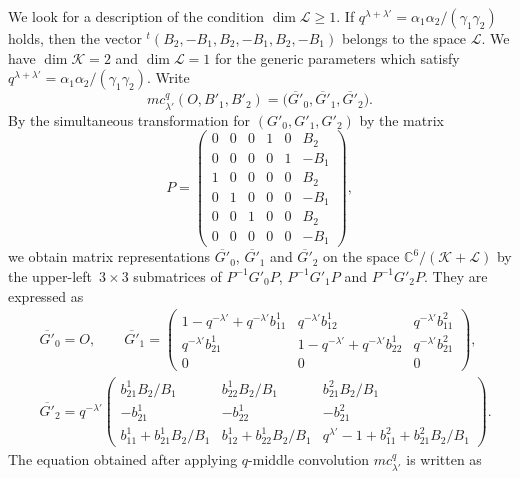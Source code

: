 \documentclass[pdftex]{sigma}
\numberwithin{equation}{section}
\theoremstyle{definition}
\begin{document}
We look for a description of the condition $\dim \mathcal{L}\geq 1$.
If $q^{\lambda+\lambda'}=\alpha_1\alpha_2/(\gamma_1\gamma_2)$ holds, then the vector ${}^t(B_2,-B_1,B_2,-B_1,B_2,-B_1)$ belongs to the space $\mathcal{L}$.
We have $\dim \mathcal{K}=2$ and ${\dim \mathcal{L}=1}$ for the generic parameters which satisfy $q^{\lambda+\lambda'}=\alpha_1\alpha_2/(\gamma_1\gamma_2)$.
Write
\[
mc^q_{\lambda'} (O, B'_1, B'_2) = \bigl(\overline{G'}_0, \overline{G'}_1, \overline{G'}_2\bigr).
\]
By the simultaneous transformation for $(G'_0, G'_1, G'_2)$ by the matrix
\begin{equation*}
P = \begin{pmatrix}
 0 & 0 & 0 & 1 & 0 & B_2 \\
 0 & 0 & 0 & 0 & 1 & -B_1 \\
 1 & 0 & 0 & 0 & 0 & B_2 \\
 0 & 1 & 0 & 0 & 0 & -B_1 \\
 0 & 0 & 1 & 0 & 0 & B_2 \\
 0 & 0 & 0 & 0 & 0 & -B_1
\end{pmatrix},
\end{equation*}
we obtain matrix representations $\overline{G'}_0$, $\overline{G'}_1$ and $\overline{G'}_2$ on the space $\mathbb{C}^6/(\mathcal{K} + \mathcal{L}) $ by the upper-left~${3\times 3}$ submatrices of $P^{-1}G'_0 P$, $P^{-1}G'_1 P$ and $P^{-1}G'_2 P$.
They are expressed as
\begin{align*}
&\overline{G'}_0 = O , \qquad \overline{G'}_1
= \begin{pmatrix}
 1 - q^{-\lambda'} + q^{-\lambda'} b^1_{11} & q^{-\lambda'}b^1_{12} & q^{-\lambda'}b^2_{11} \\
 q^{-\lambda'}b^1_{21} & 1 - q^{-\lambda'} + q^{-\lambda'} b^1_{22} & q^{-\lambda'}b^2_{21} \\
 0 & 0 & 0
 \end{pmatrix}, \\
&\overline{G'}_2
= q^{-\lambda'} \begin{pmatrix}
 \displaystyle b^1_{21} B_2 /B_1
 & \displaystyle b^1_{22} B_2 /B_1
 & \displaystyle b^2_{21} B_2 /B_1 \\
 - b^1_{21}
 & - b^1_{22}
 & - b^2_{21} \\
 \displaystyle b^1_{11} + b^1_{21} B_2 /B_1
 & \displaystyle b^1_{12} + b^1_{22} B_2 /B_1
 & q^{\lambda'} -1 + \displaystyle b^2_{11}+b^2_{21} B_2 /B_1
 \end{pmatrix}.
\end{align*}
The equation obtained after applying $q$-middle convolution $mc^q_{\lambda'}$ is written as
\end{document}
